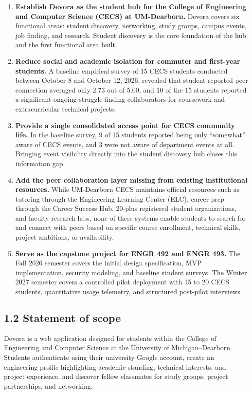 \documentclass[11pt,letterpaper]{article}
\begin{document}
\begin{enumerate}[leftmargin=*,itemsep=4pt]
\item \textbf{Establish Devora as the student hub for the College of Engineering and Computer Science (CECS) at UM-Dearborn.} Devora covers six functional areas: student discovery, networking, study groups, campus events, job finding, and research. Student discovery is the core foundation of the hub and the first functional area built.
\item \textbf{Reduce social and academic isolation for commuter and first-year students.} A baseline empirical survey of 15 CECS students conducted between October 8 and October 12, 2026, revealed that student-reported peer connection averaged only 2.73 out of 5.00, and 10 of the 15 students reported a significant ongoing struggle finding collaborators for coursework and extracurricular technical projects.
\item \textbf{Provide a single consolidated access point for CECS community life.} In the baseline survey, 9 of 15 students reported being only ``somewhat'' aware of CECS events, and 3 were not aware of department events at all. Bringing event visibility directly into the student discovery hub closes this information gap.
\item \textbf{Add the peer collaboration layer missing from existing institutional resources.} While UM-Dearborn CECS maintains official resources such as tutoring through the Engineering Learning Center (ELC), career prep through the Career Success Hub, 20-plus registered student organizations, and faculty research labs, none of these systems enable students to search for and connect with peers based on specific course enrollment, technical skills, project ambitions, or availability.
\item \textbf{Serve as the capstone project for ENGR 492 and ENGR 493.} The Fall 2026 semester covers the initial design specification, MVP implementation, security modeling, and baseline student surveys. The Winter 2027 semester covers a controlled pilot deployment with 15 to 20 CECS students, quantitative usage telemetry, and structured post-pilot interviews.
\end{enumerate}

\subsection*{1.2 Statement of scope}

Devora is a web application designed for students within the College of Engineering and Computer Science at the University of Michigan--Dearborn. Students authenticate using their university Google account, create an engineering profile highlighting academic standing, technical interests, and project experience, and discover fellow classmates for study groups, project partnerships, and networking.
\end{document}
